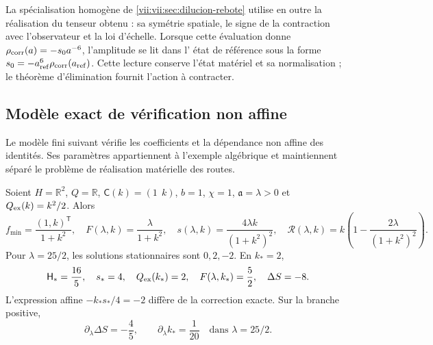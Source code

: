 La spécialisation homogène de
\ref{vii:vii:sec:dilucion-rebote} utilise en outre la réalisation du
tenseur obtenu : sa symétrie spatiale, le signe de la contraction
avec l'observateur et la loi d'échelle. Lorsque cette évaluation donne
\(\rho_{\rm corr}(a)=-s_0a^{-6}\), l'amplitude se lit dans l'
état de référence sous la forme
\(s_0=-a_{\rm ref}^{6}\rho_{\rm corr}(a_{\rm ref})\).
Cette lecture conserve l'état matériel et sa normalisation ; le
théorème d'élimination fournit l'action à contracter.

\subsection{Modèle exact de vérification non affine}
\label{vii:vii:subsec:control-no-afin}

Le modèle fini suivant vérifie les coefficients et la dépendance non affine des identités. Ses paramètres appartiennent à l'exemple algébrique et maintiennent séparé le problème de réalisation matérielle des routes.

\begin{proposition}
\label{vii:vii:prop:ejemplo-no-afin}
Soient \(H=\mathbb R^2\), \(Q=\mathbb R\), \(\mathsf C(k)=(1\ \ k)\), \(b=1\), \(\chi=1\), \(\mathfrak a=\lambda>0\) et \(Q_{\rm ex}(k)=k^2/2\). Alors
\begin{equation}
 f_{\min}=\frac{(1,k)^{\mathsf T}}{1+k^2},\quad
 F(\lambda,k)=\frac{\lambda}{1+k^2},\quad
 s(\lambda,k)=\frac{4\lambda k}{(1+k^2)^2},\quad
 \mathcal R(\lambda,k)
    =k\left(1-\frac{2\lambda}{(1+k^2)^2}\right).
 \label{vii:vii:eq:ejemplo-minimo-no-afin}
\end{equation}
Pour \(\lambda=25/2\), les solutions stationnaires sont
\(0,2,-2\). En \(k_*=2\),
\begin{equation}
 \mathsf H_*=\frac{16}{5},\quad s_*=4,\quad
 Q_{\rm ex}(k_*)=2,\quad F(\lambda,k_*)=\frac52,
 \quad \Delta S=-8.
 \label{vii:vii:eq:valores-ejemplo-no-afin}
\end{equation}
L'expression affine \(-k_*s_*/4=-2\) diffère de la correction
exacte. Sur la branche positive,
\begin{equation}
 \partial_\lambda\Delta S=-\frac45,
 \qquad \partial_\lambda k_* =\frac1{20}
 \quad\text{dans }\lambda=25/2.
 \label{vii:vii:eq:derivadas-ejemplo-no-afin}
\end{equation}
\end{proposition}

